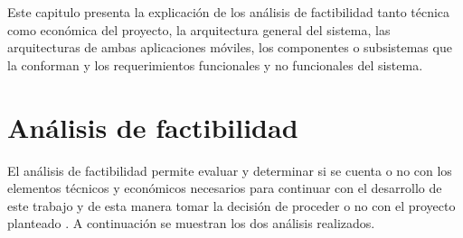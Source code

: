 Este capitulo presenta la explicación de los análisis de factibilidad tanto técnica como económica del proyecto, la arquitectura general del sistema, las arquitecturas de ambas aplicaciones móviles, los componentes o subsistemas que la conforman y los requerimientos funcionales y no funcionales del sistema. 
\section{Análisis de factibilidad}
El análisis de factibilidad permite evaluar y determinar si se cuenta o no con los elementos técnicos y económicos necesarios para continuar con el desarrollo de este trabajo y de esta manera tomar la decisión de proceder o no con el proyecto planteado \cite{Factibilidad}. A continuación se muestran los dos análisis realizados.
\\ \par
